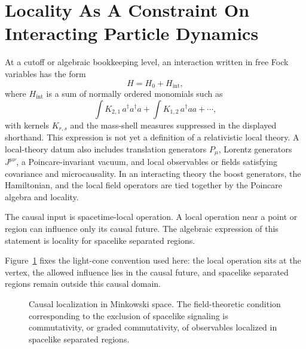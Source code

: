 \section{Locality As A Constraint On Interacting Particle Dynamics}

At a cutoff or algebraic bookkeeping level, an interaction written in free
Fock variables has the form
\[
  H=H_0+H_{\mathrm{int}},
\]
where \(H_{\mathrm{int}}\) is a sum of normally ordered monomials such as
\[
  \int K_{2,1}\,
  a^\dagger a^\dagger a
  +
  \int K_{1,2}\,
  a^\dagger a a
  +
  \cdots ,
\]
with kernels \(K_{r,s}\) and the mass-shell measures suppressed in the
displayed shorthand.  This expression is not yet a definition of a
relativistic local theory.  A local-theory datum also includes translation
generators \(P_\mu\), Lorentz generators \(J^{\mu\nu}\), a Poincare-invariant
vacuum, and local observables or fields satisfying covariance and
microcausality.  In an interacting theory the boost generators, the
Hamiltonian, and the local field operators are tied together by the Poincare
algebra and locality.

The causal input is spacetime-local operation.  A local operation near a point
or region can influence only its causal future.  The algebraic expression of
this statement is locality for spacelike separated regions.

Figure~\ref{fig:causal-lightcone-local-operation} fixes the light-cone convention
used here: the local operation sits at the vertex, the allowed influence lies in
the causal future, and spacelike separated regions remain outside this causal
domain.

\begin{figure}[H]
  \centering
  \caption{Causal localization in Minkowski space.  The field-theoretic
  condition corresponding to the exclusion of spacelike signaling is
  commutativity, or graded commutativity, of observables localized in
  spacelike separated regions.}
  \label{fig:causal-lightcone-local-operation}
\end{figure}


